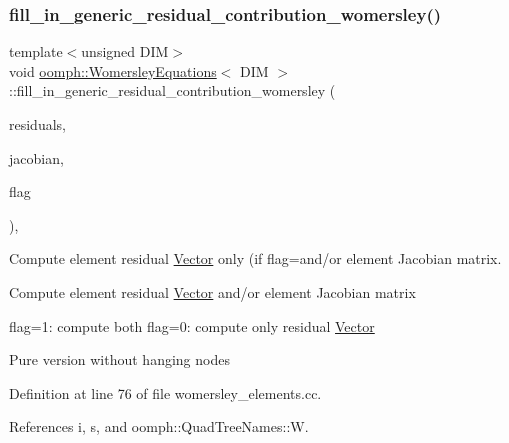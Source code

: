 \mbox{\label{classoomph_1_1WomersleyEquations_a5aebac86c117c1cc99437d26686d000e}} 
\subsubsection{\texorpdfstring{fill\+\_\+in\+\_\+generic\+\_\+residual\+\_\+contribution\+\_\+womersley()}{fill\_in\_generic\_residual\_contribution\_womersley()}}
{\footnotesize\ttfamily template$<$unsigned D\+IM$>$ \\
void \hyperlink{classoomph_1_1WomersleyEquations}{oomph\+::\+Womersley\+Equations}$<$ D\+IM $>$\+::fill\+\_\+in\+\_\+generic\+\_\+residual\+\_\+contribution\+\_\+womersley (\begin{DoxyParamCaption}\item[{\hyperlink{classoomph_1_1Vector}{Vector}$<$ double $>$ \&}]{residuals,  }\item[{\hyperlink{classoomph_1_1DenseMatrix}{Dense\+Matrix}$<$ double $>$ \&}]{jacobian,  }\item[{unsigned}]{flag }\end{DoxyParamCaption})\hspace{0.3cm}{\ttfamily [protected]}, {\ttfamily [virtual]}}



Compute element residual \hyperlink{classoomph_1_1Vector}{Vector} only (if flag=and/or element Jacobian matrix. 

Compute element residual \hyperlink{classoomph_1_1Vector}{Vector} and/or element Jacobian matrix

flag=1\+: compute both flag=0\+: compute only residual \hyperlink{classoomph_1_1Vector}{Vector}

Pure version without hanging nodes 

Definition at line 76 of file womersley\+\_\+elements.\+cc.



References i, s, and oomph\+::\+Quad\+Tree\+Names\+::W.

\mbox{\label{classoomph_1_1WomersleyEquations_a5dccff3c238209806fefdebbbef91756}} 

